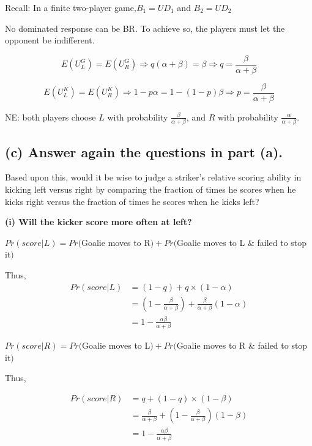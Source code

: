 \documentclass{article}
\begin{document}
\begin{mdframed}[backgroundcolor=blue!20,linecolor=white]
Recall: In a finite two-player game,$B_1 = UD_1$ and $B_2 = UD_2$

No dominated response can be BR. To achieve so, the players must let the opponent be indifferent.
\end{mdframed}


$$E(U^G_L) = E(U^G_R) \Rightarrow  q(\alpha+\beta) = \beta \Rightarrow q=\frac{\beta}{\alpha+\beta}$$
 
$$E(U^K_L) = E(U^K_R) \Rightarrow 1- p\alpha = 1-(1-p)\beta \Rightarrow p = \frac{\beta}{\alpha+\beta}$$

 
NE: both players choose $L$ with probability $\tfrac{\beta}{\alpha + \beta}$, and $R$ with probability $\tfrac{\alpha}{\alpha + \beta}$. 

   
\subsection*{(c) Answer again the questions in part (a).}

 Based upon this, would it be wise to judge a striker's relative scoring ability in kicking left versus right by comparing the fraction of times he scores when he kicks right versus the fraction of times he scores when he kicks left?

\medskip

\textbf{(i) Will the kicker score more often at left?}

$Pr(score|L) = Pr($Goalie moves to R$) + Pr($Goalie moves to L \&  failed to stop it$)$
\smallskip

Thus, 
\begin{align*}
Pr(score|L) &= (1-q) + q \times (1-\alpha) \\
&= (1-\tfrac{\beta}{\alpha + \beta}) + \tfrac{\beta}{\alpha + \beta} (1-\alpha) \\
&= 1- \tfrac{\alpha \beta }{\alpha + \beta} 
\end{align*}


$Pr(score|R) = Pr($Goalie moves to L$) + Pr($Goalie moves to R \&  failed to stop it$)$

\smallskip

Thus, 

\begin{align*}
Pr(score|R) &= q + (1-q)\times (1-\beta)  \\
&= \tfrac{\beta}{\alpha + \beta} + (1-\tfrac{\beta}{\alpha + \beta}) (1-\beta) \\
&=  1- \tfrac{\alpha \beta }{\alpha + \beta}
\end{align*}
\end{document}
